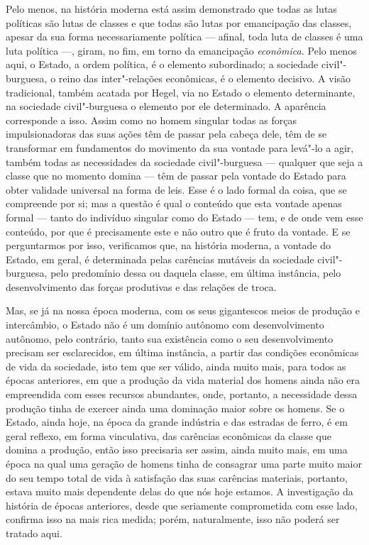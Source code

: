 Pelo menos, na história moderna está assim demonstrado que todas as
lutas políticas são lutas de classes e que todas são lutas por
emancipação das classes, apesar da sua forma necessariamente política ---
afinal, toda luta de classes é uma luta política ---, giram, no fim, em
torno da emancipação \emph{econômica. }Pelo menos aqui, o Estado, a
ordem política, é o elemento subordinado; a sociedade civil"-burguesa, o
reino das inter"-relações econômicas, é o elemento decisivo. A visão
tradicional, também acatada por Hegel, via no Estado o elemento
determinante, na sociedade civil"-burguesa o elemento por ele
determinado. A aparência corresponde a isso. Assim como no homem
singular todas as forças impulsionadoras das suas ações têm de passar
pela cabeça dele, têm de se transformar em fundamentos do movimento da
sua vontade para levá"-lo a agir, também todas as necessidades da
sociedade civil"-burguesa --- qualquer que seja a classe que no momento
domina --- têm de passar pela vontade do Estado para obter validade
universal na forma de leis. Esse é o lado formal da coisa, que se
compreende por si; mas a questão é qual o conteúdo que esta vontade
apenas formal --- tanto do indivíduo singular como do Estado --- tem, e de
onde vem esse conteúdo, por que é precisamente este e não outro que é
fruto da vontade. E se perguntarmos por isso, verificamos que, na
história moderna, a vontade do Estado, em geral, é determinada pelas
carências mutáveis da sociedade civil"-burguesa, pelo predomínio dessa ou
daquela classe, em última instância, pelo desenvolvimento das forças
produtivas e das relações de troca.

Mas, se já na nossa época moderna, com os seus gigantescos meios de
produção e intercâmbio, o Estado não é um domínio autônomo com
desenvolvimento autônomo, pelo contrário, tanto sua existência como o
seu desenvolvimento precisam ser esclarecidos, em última instância, a
partir das condições econômicas de vida da sociedade, isto tem que ser
válido, ainda muito mais, para todos as épocas anteriores, em que a
produção da vida material dos homens ainda não era empreendida com esses
recursos abundantes, onde, portanto, a necessidade dessa produção tinha
de exercer ainda uma dominação maior sobre os homens. Se o Estado, ainda
hoje, na época da grande indústria e das estradas de ferro, é em geral
reflexo, em forma vinculativa, das carências 
econômicas da classe que domina a produção, então isso precisaria ser
assim, ainda muito mais, em uma época na qual uma geração de homens
tinha de consagrar uma parte muito maior do seu tempo total de vida à
satisfação das suas carências materiais, portanto, estava muito mais
dependente delas do que nós hoje estamos. A investigação da história de
épocas anteriores, desde que seriamente comprometida com esse lado,
confirma isso na mais rica medida; porém, naturalmente, isso não poderá
ser tratado aqui.

